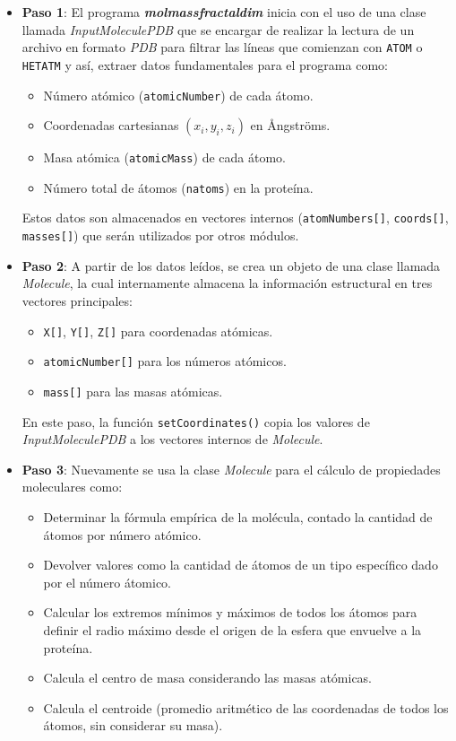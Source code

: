 	\begin{itemize}
		\item \textbf{Paso 1}:  El programa \textbf{\textit{molmassfractaldim}} inicia con el
		uso de una clase llamada \textit{InputMoleculePDB} que se encargar de realizar 
		la lectura de un archivo en formato \textit{PDB}  para filtrar las líneas que 
		comienzan con \texttt{ATOM} o \texttt{HETATM} y así, extraer datos 
		fundamentales para el programa como:  
		
		\begin{itemize}
			\item Número atómico (\texttt{atomicNumber}) de cada átomo.
			\item Coordenadas cartesianas $(x_i, y_i, z_i)$ en \AA ngstr\"oms.
			\item Masa atómica (\texttt{atomicMass}) de cada átomo.
			\item Número total de átomos (\texttt{natoms}) en la proteína.
		\end{itemize}
		Estos datos son almacenados en vectores internos (\texttt{atomNumbers[]}, \texttt{coords[]}, \texttt{masses[]}) 
		que serán utilizados por otros módulos.
	
		\item \textbf{Paso 2}: 	A partir de los datos leídos, se crea un objeto de una clase llamada \textit{Molecule},
		la cual internamente almacena la información estructural en tres vectores principales:
		
		\begin{itemize}
			\item \texttt{X[]}, \texttt{Y[]}, \texttt{Z[]} para coordenadas atómicas.
			\item \texttt{atomicNumber[]} para los números atómicos.
			\item \texttt{mass[]} para las masas atómicas.
		\end{itemize}
		

		En este paso, la función \texttt{setCoordinates()} copia los valores de \textit{InputMoleculePDB}
		 a los vectores internos de \textit{Molecule}.
		
		
		\item \textbf{Paso 3}: Nuevamente se usa la clase 
		\textit{Molecule} para el cálculo de propiedades moleculares como:
		
		\begin{itemize}
			\item Determinar la fórmula empírica de la molécula, contado la cantidad de átomos por número atómico.
			\item Devolver valores como la cantidad de átomos de un tipo específico 
			dado por el número átomico.
			\item Calcular los extremos mínimos y máximos de todos los átomos para definir 
			el radio máximo desde el origen de la esfera que envuelve a la proteína.
			\item Calcula el centro de masa considerando las masas atómicas.
			\item Calcula el centroide (promedio aritmético de las coordenadas de todos los
			átomos, sin considerar su masa).
		\end{itemize}
		

\end{itemize}
